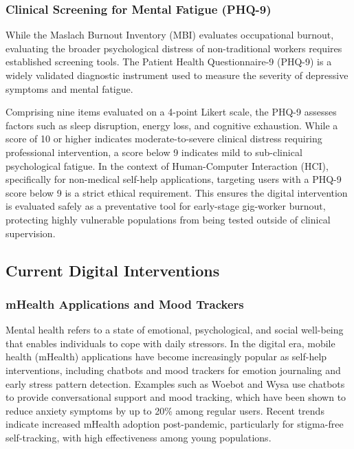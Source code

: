 \subsubsection{Clinical Screening for Mental Fatigue (PHQ-9)}

While the Maslach Burnout Inventory (MBI) evaluates occupational burnout, evaluating the broader psychological distress of non-traditional workers requires established screening tools. The Patient Health Questionnaire-9 (PHQ-9) is a widely validated diagnostic instrument used to measure the severity of depressive symptoms and mental fatigue.

Comprising nine items evaluated on a 4-point Likert scale, the PHQ-9 assesses factors such as sleep disruption, energy loss, and cognitive exhaustion. While a score of 10 or higher indicates moderate-to-severe clinical distress requiring professional intervention, a score below 9 indicates mild to sub-clinical psychological fatigue. In the context of Human-Computer Interaction (HCI), specifically for non-medical self-help applications, targeting users with a PHQ-9 score below 9 is a strict ethical requirement. This ensures the digital intervention is evaluated safely as a preventative tool for early-stage gig-worker burnout, protecting highly vulnerable populations from being tested outside of clinical supervision.

\subsection{Current Digital Interventions}

\subsubsection{mHealth Applications and Mood Trackers}

Mental health refers to a state of emotional, psychological, and social well-being that enables individuals to cope with daily stressors. In the digital era, mobile health (mHealth) applications have become increasingly popular as self-help interventions, including chatbots and mood trackers for emotion journaling and early stress pattern detection. Examples such as Woebot and Wysa use chatbots to provide conversational support and mood tracking, which have been shown to reduce anxiety symptoms by up to 20\% among regular users. Recent trends indicate increased mHealth adoption post-pandemic, particularly for stigma-free self-tracking, with high effectiveness among young populations.


